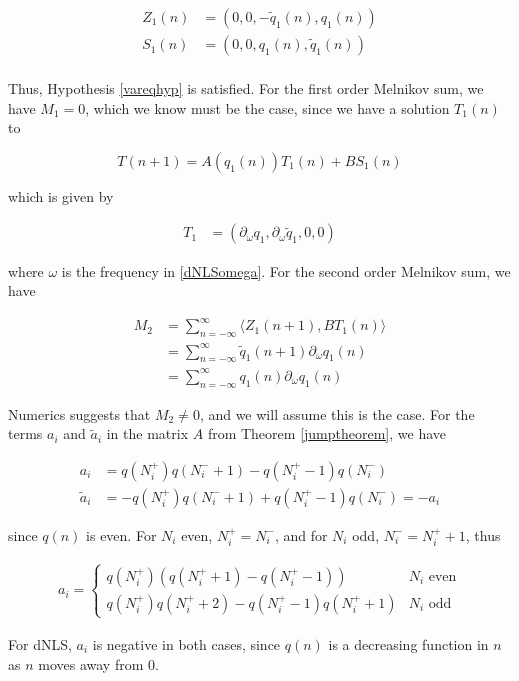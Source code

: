 \documentclass[12pt]{article}
\begin{document}
\begin{align}
Z_1(n) &= (0, 0, -\tilde{q}_1(n), q_1(n)) \\
S_1(n) &= (0, 0, q_1(n), \tilde{q}_1(n)) \\
\end{align}

Thus, Hypothesis \ref{vareqhyp} is satisfied. For the first order Melnikov sum, we have $M_1 = 0$, which we know must be the case, since we have a solution $T_1(n)$ to 

\[
T(n+1) = A(q_1(n)) T_1(n) + B S_1(n)
\]

which is given by 

\begin{align}
T_1 &= (\partial_\omega q_1, \partial_\omega \tilde{q}_1, 0, 0) 
\end{align}

where $\omega$ is the frequency in \eqref{dNLSomega}. For the second order Melnikov sum, we have

\begin{align*}
M_2 &= \sum_{n = -\infty}^\infty \langle Z_1(n+1), B T_1(n) \rangle \\
&= \sum_{n = -\infty}^\infty \tilde{q}_1(n+1) \partial_\omega q_1(n) \\
&= \sum_{n = -\infty}^\infty q_1(n) \partial_\omega q_1(n) 
\end{align*}

Numerics suggests that $M_2 \neq 0$, and we will assume this is the case. For the terms $a_i$ and $\tilde{a}_i$ in the matrix $A$ from Theorem \ref{jumptheorem}, we have

\begin{align*}
a_i &= q(N_i^+)q(N_i^- + 1) - q(N_i^+ - 1)q(N_i^-)\\
\tilde{a}_i &= -q(N_i^+)q(N_i^- + 1) + q(N_i^+ - 1)q(N_i^-) = -a_i
\end{align*}

since $q(n)$ is even. For $N_i$ even, $N_i^+ = N_i^-$, and for $N_i$ odd, $N_i^- = N_i^+ + 1$, thus

\begin{align*}
a_i = \begin{cases}
q(N_i^+)( q(N_i^+ + 1) - q(N_i^+ - 1) ) & N_i \text{ even} \\
q(N_i^+)q(N_i^+ + 2) - q(N_i^+ - 1)q(N_i^+ + 1) & N_i \text{ odd}
\end{cases}
\end{align*}

For dNLS, $a_i$ is negative in both cases, since $q(n)$ is a decreasing function in $n$ as $n$ moves away from 0.\\
\end{document}
